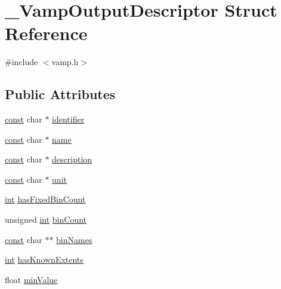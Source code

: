 \hypertarget{struct___vamp_output_descriptor}{}\section{\+\_\+\+Vamp\+Output\+Descriptor Struct Reference}
\label{struct___vamp_output_descriptor}


{\ttfamily \#include $<$vamp.\+h$>$}

\subsection*{Public Attributes}
\begin{DoxyCompactItemize}
\item 
\hyperlink{getopt1_8c_a2c212835823e3c54a8ab6d95c652660e}{const} char $\ast$ \hyperlink{struct___vamp_output_descriptor_a461161b2010370176115967e4f58a5f5}{identifier}
\item 
\hyperlink{getopt1_8c_a2c212835823e3c54a8ab6d95c652660e}{const} char $\ast$ \hyperlink{struct___vamp_output_descriptor_af4fca576bd47167fd2bf9b43d588815f}{name}
\item 
\hyperlink{getopt1_8c_a2c212835823e3c54a8ab6d95c652660e}{const} char $\ast$ \hyperlink{struct___vamp_output_descriptor_abfa911b138cfb80cf63e8f2e0fa0fb89}{description}
\item 
\hyperlink{getopt1_8c_a2c212835823e3c54a8ab6d95c652660e}{const} char $\ast$ \hyperlink{struct___vamp_output_descriptor_ad038caa8e596dfd037035637202f1d63}{unit}
\item 
\hyperlink{xmltok_8h_a5a0d4a5641ce434f1d23533f2b2e6653}{int} \hyperlink{struct___vamp_output_descriptor_ae8571f5a2bc740738af0cb7dda0c4749}{has\+Fixed\+Bin\+Count}
\item 
unsigned \hyperlink{xmltok_8h_a5a0d4a5641ce434f1d23533f2b2e6653}{int} \hyperlink{struct___vamp_output_descriptor_a652ee422092720e44d23d98bdb68f978}{bin\+Count}
\item 
\hyperlink{getopt1_8c_a2c212835823e3c54a8ab6d95c652660e}{const} char $\ast$$\ast$ \hyperlink{struct___vamp_output_descriptor_a10fffaa32bd894843ff7592240dfe447}{bin\+Names}
\item 
\hyperlink{xmltok_8h_a5a0d4a5641ce434f1d23533f2b2e6653}{int} \hyperlink{struct___vamp_output_descriptor_af6b512d772023b4e852216689c1c4465}{has\+Known\+Extents}
\item 
float \hyperlink{struct___vamp_output_descriptor_a9a28180989e3d028c12a98517479dc46}{min\+Value}
\item 
$$
\end{DoxyCompactItemize}
